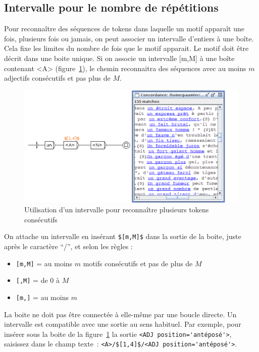 \pagebreak
\subsection{Intervalle pour le nombre de répétitions}
\label{nb-repetitions}
\noindent Pour reconnaître des séquences de tokens dans laquelle un motif apparaît une fois, plusieurs fois
ou jamais, on peut associer un intervalle d'entiers à une boîte. Cela fixe les limites du nombre de fois
que le motif apparait. Le motif doit être décrit dans une boite unique.
Si on associe un intervalle  [m,M]  à une boîte contenant <A> (figure~\ref{intervals}), le chemin reconnaitra des séquences avec au moins $m$ adjectifs consécutifs et pas plus de $M$.

\begin{figure}[h!]
\begin{center}
\includegraphics[width=13.5cm]{resources/img/fig6-10a.png}
\caption{Utilisation d'un intervalle pour reconnaître plusieurs tokens consécutifs\label{intervals}}
\end{center}
\end{figure}

\noindent  On attache un intervalle en insérant \verb+$[m,M]$+ dans la sortie de la boite,
juste après le caractère ``/'', et selon les règles : 
\begin{itemize}
\item \verb+[m,M]+ = au moins $m$ motifs consécutifs et pas de plus de $M$
\item \verb+[,M]+ = de 0 à $M$  
\item \verb+[m,]+ = au moins $m$
\end{itemize}

\noindent La boite ne doit pas être connectée à elle-même par une boucle directe. Un intervalle est compatible avec 
une sortie au sens habituel. Par exemple, pour insérer sous la boite de la figure~\ref{intervals}
la sortie \verb+<ADJ position='antéposé'>+, saisissez  dans le champ
texte~: \verb+<A>/$[1,4]$/<ADJ position='antéposé'>+. 

